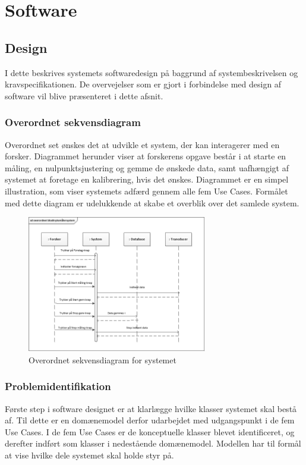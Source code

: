    
\section{Software}
\subsection{Design}
I dette beskrives systemets softwaredesign på baggrund af systembeskrivelsen og kravspecifikationen. De overvejelser som er gjort i forbindelse med design af software vil blive præsenteret i dette afsnit.

\subsubsection{Overordnet sekvensdiagram}
Overordnet set ønskes det at udvikle et system, der kan interagerer med en forsker. Diagrammet herunder viser at forskerens opgave består i at starte en måling, en nulpunktsjustering og gemme de ønskede data, samt uafhængigt af systemet at foretage en kalibrering, hvis det ønskes. Diagrammet er en simpel illustration, som viser systemets adfærd gennem alle fem Use Cases. Formålet med dette diagram er udelukkende at skabe et overblik over det samlede system.

\begin{figure}[H]
	\centering
	\includegraphics[width=0.7\textwidth]{Figurer/OverordnetSD}
	\caption{Overordnet sekvensdiagram for systemet}
	\label{fig:Overordnet sekvensdiagram for systemet}
\end{figure}

\subsubsection{Problemidentifikation}
Første step i software designet er at klarlægge hvilke klasser systemet skal bestå af. Til dette er en domænemodel derfor udarbejdet med udgangspunkt i de fem Use Cases. I de fem Use Cases er de konceptuelle klasser blevet identificeret, og derefter indført som klasser i nedestående domænemodel. Modellen har til formål at vise hvilke dele systemet skal holde styr på. 

